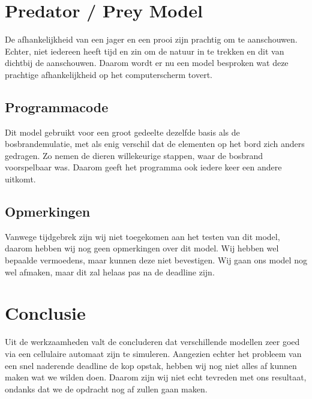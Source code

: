 \documentclass[11pt,a4paper,oneside,noindent]{article}
\begin{document}
\section{Predator / Prey Model}
De afhankelijkheid van een jager en een prooi zijn prachtig om te aanschouwen. Echter, niet iedereen heeft tijd en zin om de natuur in te trekken en dit van dichtbij de aanschouwen. Daarom wordt er nu een model besproken wat deze prachtige afhankelijkheid op het computerscherm tovert.

\subsection{Programmacode}
Dit model gebruikt voor een groot gedeelte dezelfde basis als de bosbrandemulatie, met als enig verschil dat de elementen op het bord zich anders gedragen. Zo nemen de dieren willekeurige stappen, waar de bosbrand voorspelbaar was. Daarom geeft het programma ook iedere keer een andere uitkomt.

\subsection{Opmerkingen}
Vanwege tijdgebrek zijn wij niet toegekomen aan het testen van dit model, daarom hebben wij nog geen opmerkingen over dit model. Wij hebben wel bepaalde vermoedens, maar kunnen deze niet bevestigen. Wij gaan ons model nog wel afmaken, maar dit zal helaas pas na de deadline zijn.

\section{Conclusie}
Uit de werkzaamheden valt de concluderen dat verschillende modellen zeer goed via een cellulaire automaat zijn te simuleren. Aangezien echter het probleem van een snel naderende deadline de kop opstak, hebben wij nog niet alles af kunnen maken wat we wilden doen. Daarom zijn wij niet echt tevreden met ons resultaat, ondanks dat we de opdracht nog af zullen gaan maken.
\end{document}
